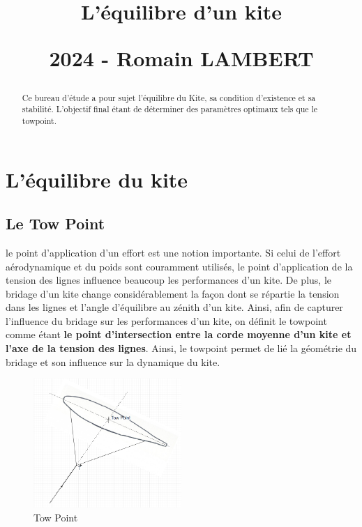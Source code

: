 \documentclass[conference]{IEEEtran}
\begin{document}
\title{\LARGE L'équilibre d'un kite
\vskip10pt

\small 2024 - Romain LAMBERT
}
\maketitle

\begin{abstract}Ce bureau d'étude a pour sujet l'équilibre du Kite, sa condition d'existence et sa stabilité. L'objectif final étant de déterminer des paramètres optimaux tels que le towpoint. 
\end{abstract}
\IEEEoverridecommandlockouts

\IEEEpeerreviewmaketitle
\section{L'équilibre du kite}

\subsection{Le Tow Point} 

le point d'application d'un effort est une notion importante. Si celui de l'effort aérodynamique et du poids sont couramment utilisés, le point d'application de la tension des lignes influence beaucoup les performances d'un kite. De plus, le bridage d'un kite change considérablement la façon dont se répartie la tension dans les lignes et l'angle d'équilibre au zénith d'un kite. Ainsi, afin de capturer l'influence du bridage sur les performances d'un kite, on définit le towpoint comme étant \textbf{le point d'intersection entre la corde moyenne d'un kite et l'axe de la tension des lignes}. Ainsi, le towpoint permet de lié la géométrie du bridage et son influence sur la dynamique du kite.  \\

\begin{figure}[H]
    \centering
    \includegraphics[width=0.5\textwidth]{Pics/TowPoint.png}  
    \caption{Tow Point}
    \label{fig:Tow Point}
\end{figure}
\end{document}
